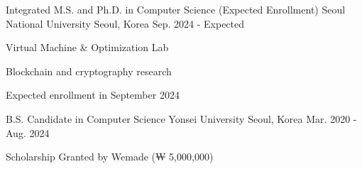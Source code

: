 


\begin{cventries}


\cventry
{Integrated M.S. and Ph.D. in Computer Science (Expected Enrollment)} %
{Seoul National University} %
{Seoul, Korea} %
{Sep. 2024 - Expected} %
{ %
\begin{cvitems}
\item {Virtual Machine \& Optimization Lab}
\item {Blockchain and cryptography research}
\item {Expected enrollment in September 2024}
\end{cvitems}
}

\cventry
{B.S. Candidate in Computer Science} %
{Yonsei University} %
{Seoul, Korea} %
{Mar. 2020 - Aug. 2024} %
{ %
\begin{cvitems}
\item {Scholarship Granted by Wemade (₩ 5,000,000)}
\end{cvitems}
}


\end{cventries}